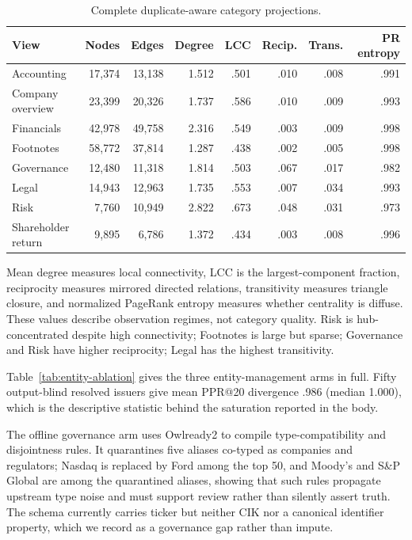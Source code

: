 \begin{table}[h]
\centering
\caption{Complete duplicate-aware category projections.}
\small
\begin{tabular}{lrrrrrrr}
\toprule
View & Nodes & Edges & Degree & LCC & Recip. & Trans. & PR entropy\\
\midrule
Accounting & 17,374 & 13,138 & 1.512 & .501 & .010 & .008 & .991\\
Company overview & 23,399 & 20,326 & 1.737 & .586 & .010 & .009 & .993\\
Financials & 42,978 & 49,758 & 2.316 & .549 & .003 & .009 & .998\\
Footnotes & 58,772 & 37,814 & 1.287 & .438 & .002 & .005 & .998\\
Governance & 12,480 & 11,318 & 1.814 & .503 & .067 & .017 & .982\\
Legal & 14,943 & 12,963 & 1.735 & .553 & .007 & .034 & .993\\
Risk & 7,760 & 10,949 & 2.822 & .673 & .048 & .031 & .973\\
Shareholder return & 9,895 & 6,786 & 1.372 & .434 & .003 & .008 & .996\\
\bottomrule
\end{tabular}
\end{table}
Mean degree measures local connectivity, LCC is the largest-component fraction, reciprocity measures mirrored directed relations, transitivity measures triangle closure, and normalized PageRank entropy measures whether centrality is diffuse. These values describe observation regimes, not category quality. Risk is hub-concentrated despite high connectivity; Footnotes is large but sparse; Governance and Risk have higher reciprocity; Legal has the highest transitivity.

Table~\ref{tab:entity-ablation} gives the three entity-management arms in full. Fifty output-blind resolved issuers give mean PPR@20 divergence .986 (median 1.000), which is the descriptive statistic behind the saturation reported in the body.

The offline governance arm uses Owlready2 to compile type-compatibility and disjointness rules. It quarantines five aliases co-typed as companies and regulators; Nasdaq is replaced by Ford among the top 50, and Moody's and S\&P Global are among the quarantined aliases, showing that such rules propagate upstream type noise and must support review rather than silently assert truth. The schema currently carries ticker but neither CIK nor a canonical identifier property, which we record as a governance gap rather than impute.

